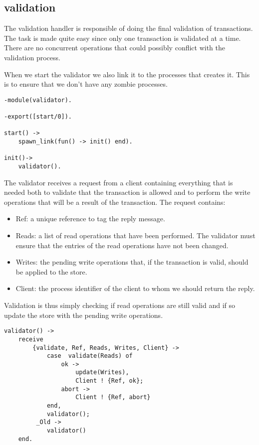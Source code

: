 \documentclass[a4paper, 11pt]{article}
\begin{document}
\subsection{validation}

The validation handler is responsible of doing the final validation of
transactions. The task is made quite easy since only one transaction
is validated at a time. There are no concurrent operations that could
possibly conflict with the validation process. 

When we start the validator we also link it to the processes that
creates it. This is to ensure that we don't have any zombie processes.

\begin{verbatim}
-module(validator).

-export([start/0]).

start() ->
    spawn_link(fun() -> init() end).

init()->
    validator().
\end{verbatim}

The validator receives a request from a client containing everything
that is needed both to validate that the transaction is allowed and to
perform the write operations that will be a result of the
transaction. The request contains:

\begin{itemize}

\item Ref: a unique reference to tag the reply message.

\item Reads: a list of read operations that have been performed. The
  validator must ensure that the entries of the read operations have
  not been changed.

\item Writes: the pending write operations that, if the transaction is
  valid, should be applied to the store.

\item Client: the process identifier of the client to whom we should
  return the reply.
\end{itemize}

Validation is thus simply checking if read operations are still valid
and if so update the store with the pending write operations.

\begin{verbatim}
validator() ->
    receive
        {validate, Ref, Reads, Writes, Client} ->
            case  validate(Reads) of
                ok ->
                    update(Writes),
                    Client ! {Ref, ok};
                abort ->
                    Client ! {Ref, abort}
            end,
            validator();
         _Old ->
            validator()
    end.
\end{verbatim}
\end{document}
